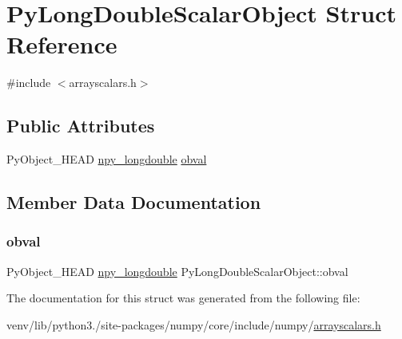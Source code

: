 \hypertarget{structPyLongDoubleScalarObject}{}\section{Py\+Long\+Double\+Scalar\+Object Struct Reference}
\label{structPyLongDoubleScalarObject}


{\ttfamily \#include $<$arrayscalars.\+h$>$}

\subsection*{Public Attributes}
\begin{DoxyCompactItemize}
\item 
Py\+Object\+\_\+\+H\+E\+AD \hyperlink{npy__common_8h_ad677a4063faf32de2fe57fdf0fbbf1fa}{npy\+\_\+longdouble} \hyperlink{structPyLongDoubleScalarObject_ab0651e8c5a31d24d2672e45c3f206fee}{obval}
\end{DoxyCompactItemize}


\subsection{Member Data Documentation}
\mbox{\label{structPyLongDoubleScalarObject_ab0651e8c5a31d24d2672e45c3f206fee}} 
\subsubsection{\texorpdfstring{obval}{obval}}
{\footnotesize\ttfamily Py\+Object\+\_\+\+H\+E\+AD \hyperlink{npy__common_8h_ad677a4063faf32de2fe57fdf0fbbf1fa}{npy\+\_\+longdouble} Py\+Long\+Double\+Scalar\+Object\+::obval}



The documentation for this struct was generated from the following file\+:\begin{DoxyCompactItemize}
\item 
venv/lib/python3./site-\/packages/numpy/core/include/numpy/\hyperlink{arrayscalars_8h}{arrayscalars.\+h}\end{DoxyCompactItemize}
